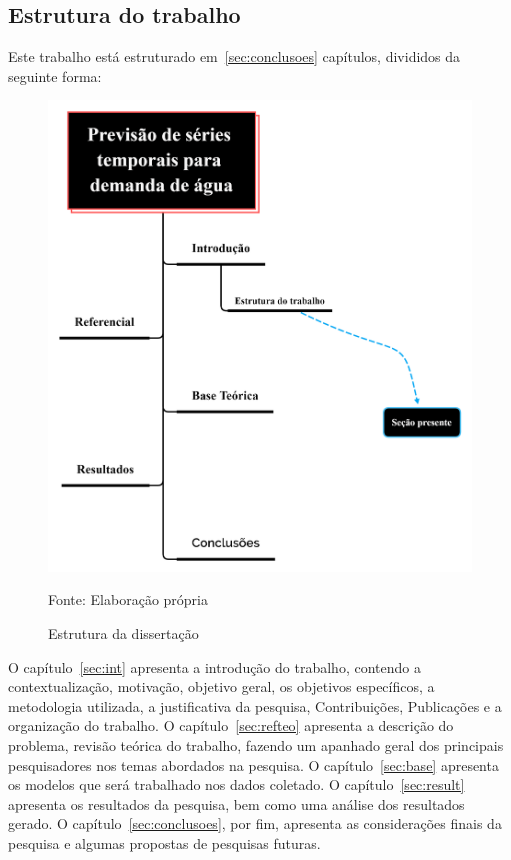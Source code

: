 \subsection{Estrutura do trabalho} \label{subsec:estrutura}
    Este trabalho está estruturado em~\ref{sec:conclusoes} capítulos, divididos da seguinte forma:
    
    \begin{figure}[H]
    	\centering
    	\caption{Estrutura da dissertação}
    	\label{fig:estrutura}
    	\includegraphics[width=0.7\linewidth]{Introducao/Figuras/Estrutura}
    	
    	Fonte: Elaboração própria 
    \end{figure}
    
    

        O capítulo~\ref{sec:int} apresenta a introdução do trabalho, contendo a contextualização, motivação, objetivo geral, os objetivos específicos, a metodologia utilizada, a justificativa da pesquisa, Contribuições, Publicações e a organização do trabalho.
        O capítulo~\ref{sec:refteo} apresenta a descrição do problema, revisão teórica do trabalho, fazendo um apanhado geral dos principais pesquisadores nos temas abordados na pesquisa.
        O capítulo~\ref{sec:base} apresenta os modelos que será trabalhado nos dados coletado.
        O capítulo~\ref{sec:result} apresenta os resultados da pesquisa, bem como uma análise dos resultados gerado.
        O capítulo~\ref{sec:conclusoes}, por fim, apresenta as considerações finais da pesquisa e algumas propostas de pesquisas futuras.
    
    
    